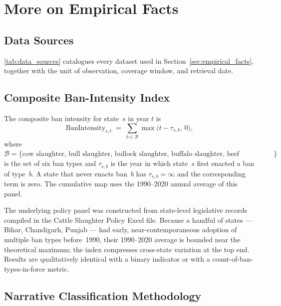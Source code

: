 \documentclass[11pt,twoside]{extarticle}
\begin{document}
\section{More on Empirical Facts} \label{app:more_empirical_facts}

\subsection{Data Sources} \label{app:data_sources}

\autoref{tab:data_sources} catalogues every dataset used in
Section~\ref{sec:empirical_facts}, together with the unit of observation,
coverage window, and retrieval date.

\subsection{Composite Ban-Intensity Index} \label{app:ban_intensity}

The composite ban intensity for state~$s$ in year $t$ is
\begin{equation*}
\text{BanIntensity}_{s,t}
\;=\;\sum_{b\in\mathcal{B}} \max\!\big(t-\tau_{s,b},\,0\big),
\end{equation*}
where $\mathcal{B}=\{\text{cow slaughter, bull slaughter, bullock slaughter,
buffalo slaughter, beef possession, beef sales}\}$ is the set of six ban
types and $\tau_{s,b}$ is the year in which state~$s$ first enacted a ban of
type~$b$. A state that never enacts ban~$b$ has $\tau_{s,b}=\infty$ and the
corresponding term is zero. The cumulative map uses the
1990--2020 annual average of this panel.

The underlying policy panel was constructed from state-level legislative
records compiled in the Cattle Slaughter Policy Excel file. Because a handful of states --- Bihar, Chandigarh,
Punjab --- had early, near-contemporaneous adoption of multiple ban types
before~1990, their 1990--2020 average is bounded near the theoretical
maximum; the index compresses cross-state variation at the top end. Results
are qualitatively identical with a binary indicator or with a
count-of-ban-types-in-force metric.



\subsection{Narrative Classification Methodology} \label{app:narrative_classification}
\end{document}
